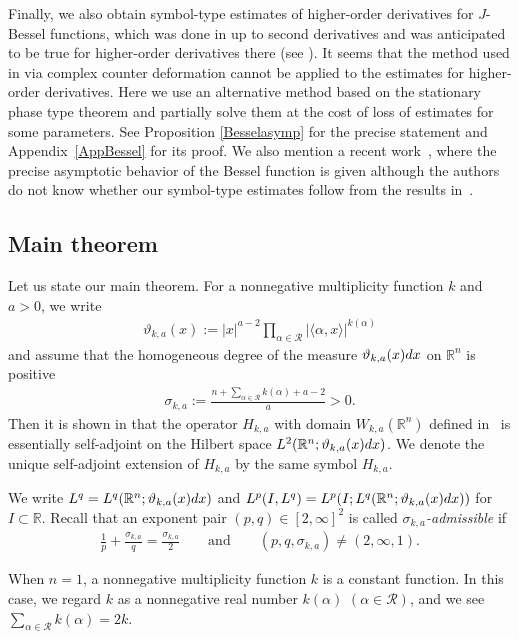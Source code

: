 \documentclass[10pt,a4paper]{article}
\numberwithin{equation}{section}
\def\R{\mathbb{R}}%
\def\s{\sigma}
\newcommand{\cR}{\mathcal{R}}
\begin{document}
Finally, we also obtain symbol-type estimates of higher-order derivatives for $J$-Bessel functions, which was done in \cite{IJ} up to second derivatives and was anticipated to be true for higher-order derivatives there (see \cite[Remark after Theorem 9.1]{IJ}). It seems that the method used in \cite{IJ} via complex counter deformation cannot be applied to the estimates for higher-order derivatives. Here we use an alternative method based on the stationary phase type theorem and partially solve them at the cost of loss of estimates for some parameters.
See Proposition \ref{Besselasymp} for the precise statement and Appendix~\ref{AppBessel} for its proof. We also mention a recent work~\cite{Sh}, where the precise asymptotic behavior of the Bessel function is given although the authors do not know whether our symbol-type estimates follow from the results in~\cite{Sh}.

\subsection{Main theorem}
Let us state our main theorem.
For a nonnegative multiplicity function $k$ and $a>0$, we write
\begin{align}\label{vartheta}
\vartheta_{k,a}(x):=|x|^{a-2}\prod_{\alpha\in\cR}|\langle\alpha,x\rangle|^{k(\alpha)}
\end{align}
and assume that the homogeneous degree of the measure $\vartheta_{k,a}(x){\rm d}x$ on $\R^n$ is positive
\begin{align}\label{eq:positive}
\sigma_{k,a}:=\frac{n+\sum_{\alpha\in\cR}k(\alpha)+a-2}{a}>0.
\end{align}
Then it is shown in \cite[Corollary 3.22]{BKO} that the operator $H_{k,a}$ with domain $W_{k,a}(\R^n)$ defined in~\cite[equation~(3.29)]{BKO} is essentially self-adjoint on the Hilbert space $L^2(\R^n; \vartheta_{k,a}(x) {\rm d}x)$. We denote the unique self-adjoint extension of $H_{k,a}$ by the same symbol $H_{k,a}$.

We write $L^q=L^q(\R^n;\vartheta_{k,a}(x){\rm d}x )$ and $L^p(I, L^q)=L^p(I; L^q(\R^n;\vartheta_{k,a}(x){\rm d}x ))$ for $I\subset \R$.
Recall that an exponent pair $(p,q)\in[2,\infty]^2$ is called \emph{$\sigma_{k,a}$-admissible} if
\begin{align*}%
\frac{1}{p}+\frac{\s_{k,a}}{q}=\frac{\s_{k,a}}{2} \qquad \text{and}\qquad (p,q,\s_{k,a})\neq (2,\infty,1).
\end{align*}

When $n=1$, a nonnegative multiplicity function $k$ is a constant function.
In this case, we regard $k$ as a nonnegative real number $k(\alpha)$ $(\alpha\in\cR)$, and we see $\sum_{\alpha\in\cR}k(\alpha)=2k$.
\end{document}
